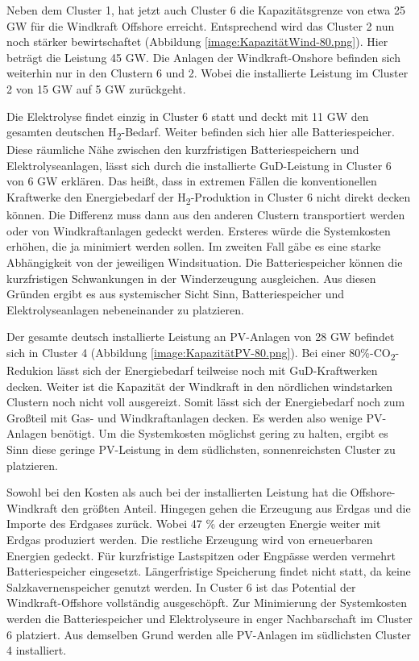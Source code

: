 
Neben dem Cluster 1, hat jetzt auch Cluster 6 die Kapazitätsgrenze von etwa 25 GW für die Windkraft Offshore erreicht. Entsprechend wird das Cluster 2 nun noch stärker bewirtschaftet (Abbildung \ref{image:KapazitätWind-80.png}). Hier beträgt die Leistung 45 GW. Die Anlagen der Windkraft-Onshore befinden sich weiterhin nur in den Clustern 6 und 2. Wobei die installierte Leistung im Cluster 2 von 15 GW auf 5 GW zurückgeht. 

Die Elektrolyse findet einzig in Cluster 6 statt und deckt mit 11 GW den gesamten deutschen H\textsubscript{2}-Bedarf. Weiter befinden sich hier alle Batteriespeicher. Diese räumliche Nähe zwischen den kurzfristigen Batteriespeichern und Elektrolyseanlagen, lässt sich durch die installierte GuD-Leistung in Cluster 6 von 6 GW erklären. Das heißt, dass in extremen Fällen die konventionellen Kraftwerke den Energiebedarf der H\textsubscript{2}-Produktion in Cluster 6 nicht direkt decken können. Die Differenz muss dann aus den anderen Clustern transportiert werden oder von Windkraftanlagen gedeckt werden. Ersteres würde die Systemkosten erhöhen, die ja minimiert werden sollen. Im zweiten Fall gäbe es eine starke Abhängigkeit von der jeweiligen Windsituation. Die Batteriespeicher können die kurzfristigen Schwankungen in der Winderzeugung ausgleichen. Aus diesen Gründen ergibt es aus systemischer Sicht Sinn, Batteriespeicher und Elektrolyseanlagen nebeneinander zu platzieren. 


Der gesamte deutsch installierte Leistung an PV-Anlagen von 28 GW befindet sich in Cluster 4 (Abbildung \ref{image:KapazitätPV-80.png}). Bei einer 80\%-CO\textsubscript{2}-Redukion lässt sich der Energiebedarf teilweise noch mit GuD-Kraftwerken decken. Weiter ist die Kapazität der Windkraft in den nördlichen windstarken Clustern noch nicht voll ausgereizt. Somit lässt sich der Energiebedarf noch zum Großteil mit Gas- und Windkraftanlagen decken. Es werden also wenige PV-Anlagen benötigt. Um die Systemkosten möglichst gering zu halten, ergibt es Sinn diese geringe PV-Leistung in dem südlichsten, sonnenreichsten Cluster zu platzieren. 

Sowohl bei den Kosten als auch bei der installierten Leistung hat die Offshore-Windkraft den größten Anteil. Hingegen gehen die Erzeugung aus Erdgas und die Importe des Erdgases zurück. Wobei 47 \% der erzeugten Energie weiter mit Erdgas produziert werden. Die restliche Erzeugung wird von erneuerbaren Energien gedeckt. Für kurzfristige Lastspitzen oder Engpässe werden vermehrt Batteriespeicher eingesetzt. Längerfristige Speicherung findet nicht statt, da keine Salzkavernenspeicher genutzt werden. In Custer 6 ist das Potential der Windkraft-Offshore vollständig ausgeschöpft. Zur Minimierung der Systemkosten werden die Batteriespeicher und Elektrolyseure in enger Nachbarschaft im Cluster 6 platziert. Aus demselben Grund werden alle PV-Anlagen im südlichsten Cluster 4 installiert.


